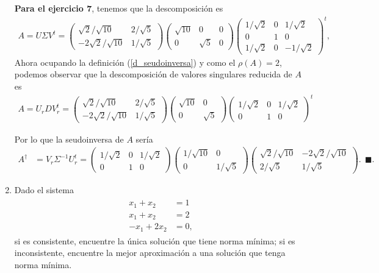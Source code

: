 \documentclass[11pt,letterpaper]{article}
\newcommand{\finf}{\blacksquare.}
\begin{document}
\begin{enumerate}
\textbf{Para el ejercicio 7}, tenemos que la descomposición es 
\begin{align*}
A=U\Sigma V^t=\begin{pmatrix}
\sqrt{2} / \sqrt{10} & 2/\sqrt{5}\\
-2\sqrt{2}/\sqrt{10} & 1/\sqrt{5}
\end{pmatrix}\begin{pmatrix}
\sqrt{10} & 0 & 0\\
0 & \sqrt{5} & 0
\end{pmatrix}\begin{pmatrix}
1/\sqrt{2} & 0 & 1/\sqrt{2}\\
0 & 1 & 0\\
1/\sqrt{2} & 0 & -1/\sqrt{2}
\end{pmatrix}^t,
\end{align*}
Ahora ocupando la definición (\ref{d_seudoinversa}) y como el $\rho(A)=2$, podemos observar que la descomposición de valores singulares reducida de $A$ es 
\begin{align*}
A = U_rD V_r^t=\begin{pmatrix}
\sqrt{2} / \sqrt{10} & 2/\sqrt{5}\\
-2\sqrt{2}/\sqrt{10} & 1/\sqrt{5}
\end{pmatrix}\begin{pmatrix}
\sqrt{10} & 0\\
0 & \sqrt{5} 
\end{pmatrix}\begin{pmatrix}
1/\sqrt{2} & 0 & 1/\sqrt{2}\\
0 & 1 & 0
\end{pmatrix}^t
\end{align*}

Por lo que la seudoinversa de $A$ sería  
\begin{align*}
A^\dagger &= V_r\Sigma^{-1} U_r^t=\begin{pmatrix}
1/\sqrt{2} & 0 & 1/\sqrt{2}\\
0 & 1 & 0
\end{pmatrix}
\begin{pmatrix}
1/\sqrt{10} & 0\\
0 & 1/\sqrt{5} 
\end{pmatrix}\begin{pmatrix}
\sqrt{2} / \sqrt{10} & -2\sqrt{2}/\sqrt{10} \\
2/\sqrt{5}  & 1/\sqrt{5}
\end{pmatrix}. \ \ \finf
\end{align*}

\item Dado el sistema 
\begin{align*}
\begin{array}{cc}
x_1+x_2&=1\\
x_1+x_2&=2\\
-x_1+2x_2&=0,
\end{array}
\end{align*}
si es consistente, encuentre la única solución que tiene norma mínima; si es inconsistente, encuentre la mejor aproximación a una solución que tenga norma mínima.


\end{enumerate}
\end{document}
